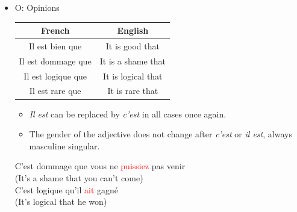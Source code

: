 \documentclass{book}
\begin{document}
\begin{itemize}
            \item O: Opinions
            \begin{center}
                \begin{tabular}{|c|c|}
                    \hline
                    \textbf{French} & \textbf{English} \\
                    \hline
                    Il est bien que & It is good that \\
                    \hline
                    Il est dommage que & It is a shame that \\
                    \hline
                    Il est logique que & It is logical that \\
                    \hline
                    Il est rare que & It is rare that \\
                    \hline
                \end{tabular}
            \end{center}
            \begin{itemize}
                \item \textit{Il est} can be replaced by \textit{c'est} in all cases once again.
                \item The gender of the adjective does not change after \textit{c'est} or \textit{il est}, always masculine singular.
            \end{itemize}
            \begin{center}
                C'est dommage que vous ne \textcolor{red}{puissiez} pas venir \\
                (It's a shame that you can't come) \\
                C'est logique qu'il \textcolor{red}{ait} gagné \\
                (It's logical that he won)
            \end{center}
        \end{itemize}
\end{document}
